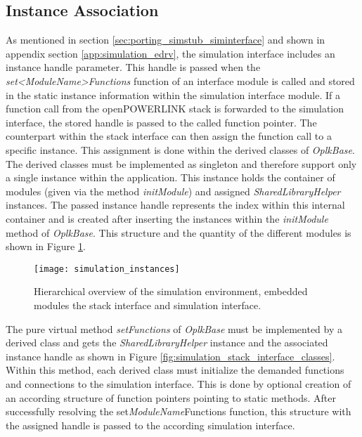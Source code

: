 \subsection{Instance Association}
\label{sec:porting_stack_instance_assoc}
As mentioned in section \ref{sec:porting_simstub_siminterface} and shown in appendix section \ref{app:simulation_edrv}, the simulation interface includes an instance handle parameter.
This handle is passed when the \emph{set<ModuleName>Functions} function of an interface module is called and stored in the static instance information within the simulation interface module.
If a function call from the openPOWERLINK stack is forwarded to the simulation interface, the stored handle is passed to the called function pointer.
The counterpart within the stack interface can then assign the function call to a specific instance.
This assignment is done within the derived classes of \emph{OplkBase}.
The derived classes must be implemented as singleton and therefore support only a single instance within the application.
This instance holds the container of modules (given via the method \emph{initModule}) and assigned \emph{SharedLibraryHelper} instances.
The passed instance handle represents the index within this internal container and is created after inserting the instances within the \emph{initModule} method of \emph{OplkBase}.
This structure and the quantity of the different modules is shown in Figure \ref{fig:simulation_instances}.

\begin{figure}
    \centering
    \texttt{[image: simulation\_instances]}
    \caption{Hierarchical overview of the simulation environment, embedded modules the stack interface and simulation interface.}
    \label{fig:simulation_instances}
\end{figure}

The pure virtual method \emph{setFunctions} of \emph{OplkBase} must be implemented by a derived class and gets the \emph{SharedLibraryHelper} instance and the associated instance handle as shown in  Figure \ref{fig:simulation_stack_interface_classes}.
Within this method, each derived class must initialize the demanded functions and connections to the simulation interface.
This is done by optional creation of an according structure of function pointers pointing to static methods.
After successfully resolving the set\emph{ModuleName}Functions function, this structure with the assigned handle is passed to the according simulation interface.

